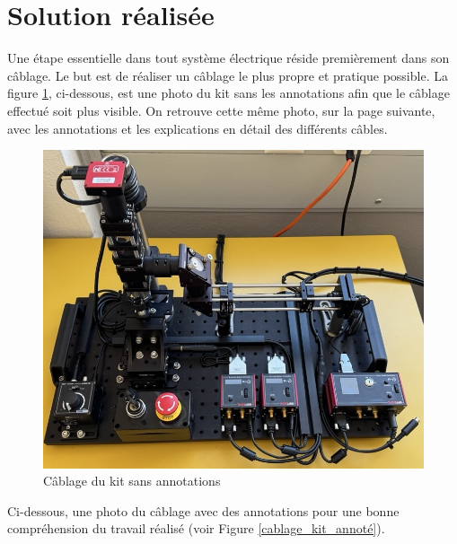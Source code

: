 \section{Solution réalisée}
Une étape essentielle dans tout système électrique réside premièrement dans son câblage. Le but est de réaliser un câblage le plus propre et pratique possible. La figure \ref{cablage_kit_pas_annoté}, ci-dessous, est une photo du kit sans les annotations afin que le câblage effectué soit plus visible. On retrouve cette même photo, sur la page suivante, avec les annotations et les explications en détail des différents câbles.
\begin{figure}[H]
    \begin{center}
        \includegraphics[width=\textwidth]{assets/figures/Cablage_du_kit/Cablage_vierge.jpeg}
    \end{center}
    \caption{Câblage du kit sans annotations}
    \label{cablage_kit_pas_annoté}
\end{figure}

\newpage
Ci-dessous, une photo du câblage avec des annotations pour une bonne compréhension du travail réalisé (voir Figure \ref{cablage_kit_annoté}).


